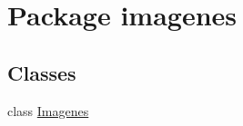 \hypertarget{namespaceimagenes}{}\section{Package imagenes}
\label{namespaceimagenes}
\subsection*{Classes}
\begin{DoxyCompactItemize}
\item 
class \mbox{\hyperlink{classimagenes_1_1_imagenes}{Imagenes}}
\end{DoxyCompactItemize}
